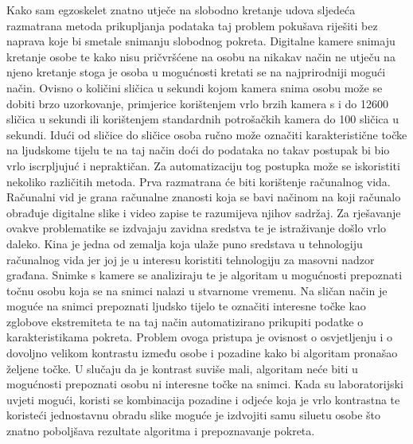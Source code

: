 \documentclass[times, utf8, diplomski]{fer}
\begin{document}
Kako sam egzoskelet znatno utječe na slobodno kretanje udova sljedeća razmatrana metoda prikupljanja podataka taj problem pokušava riješiti
bez naprava koje bi smetale snimanju slobodnog pokreta. Digitalne kamere snimaju kretanje osobe te kako nisu pričvršćene na osobu
na nikakav način ne utječu na njeno kretanje stoga je osoba u mogućnosti kretati se na najprirodniji mogući način. Ovisno o količini
sličica u sekundi kojom kamera snima osobu može se dobiti brzo uzorkovanje, primjerice korištenjem vrlo brzih kamera s i do
12600 sličica u sekundi ili korištenjem standardnih potrošačkih kamera do 100 sličica u sekundi. Idući od sličice do sličice osoba ručno
može označiti karakteristične točke na ljudskome tijelu te na taj način doći do podataka no takav postupak bi bio vrlo iscrpljujuć i
nepraktičan. Za automatizaciju tog postupka može se iskoristiti nekoliko različitih metoda. Prva razmatrana će biti korištenje
računalnog vida. Računalni vid je grana računalne znanosti koja se bavi načinom na koji računalo obrađuje digitalne slike i video zapise 
te razumijeva njihov sadržaj. Za rješavanje ovakve problematike se izdvajaju zavidna sredstva te je istraživanje došlo vrlo daleko.
Kina je jedna od zemalja koja ulaže puno sredstava u tehnologiju računalnog vida jer joj je u interesu koristiti tehnologiju za 
masovni nadzor građana. Snimke s kamere se analiziraju te je algoritam u mogućnosti prepoznati točnu osobu koja se na 
snimci nalazi u stvarnome vremenu. Na sličan način je moguće na snimci prepoznati ljudsko tijelo te označiti interesne točke kao zglobove ekstremiteta
te na taj način automatizirano prikupiti podatke o karakteristikama pokreta. Problem ovoga pristupa je ovisnost o osvjetljenju i o
dovoljno velikom kontrastu između osobe i pozadine kako bi algoritam pronašao željene točke. U slučaju da je kontrast suviše mali, 
algoritam neće biti u mogućnosti prepoznati osobu ni interesne točke na snimci. Kada su laboratorijski uvjeti mogući, koristi se
kombinacija pozadine i odjeće koja je vrlo kontrastna te koristeći jednostavnu obradu slike moguće je izdvojiti samu siluetu osobe
što znatno poboljšava rezultate algoritma i prepoznavanje pokreta.
\end{document}
